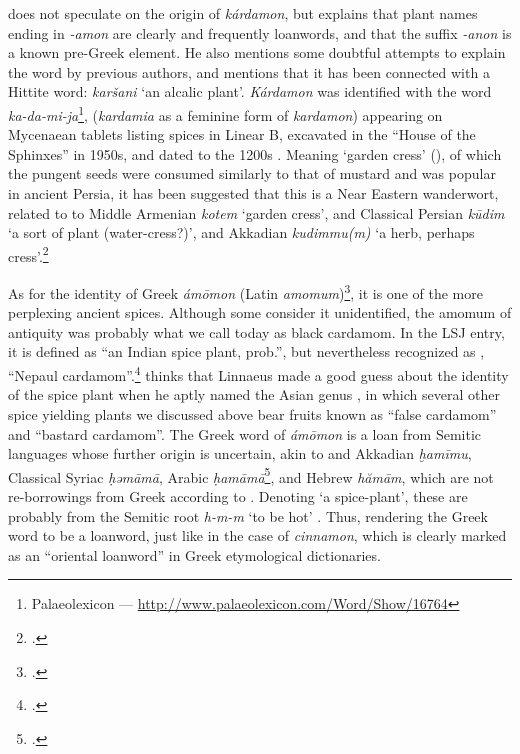 \textcite[644]{beekes_etymological_2010} does not speculate on the origin of \textit{kárdamon}, but explains that plant names ending in \textit{-amon} are clearly and frequently loanwords, and that the suffix \textit{-anon} is a known pre-Greek element. He also mentions some doubtful attempts to explain the word by previous authors, and mentions that it has been connected with a Hittite word: \textit{karšani} `an alcalic plant'. \textit{Kárdamon} was identified with the word \lb{\KADAMIJA} \textit{ka-da-mi-ja}\footnote{Palaeolexicon --- \url{http://www.palaeolexicon.com/Word/Show/16764}}, (\textit{kardamia} as a feminine form of \textit{kardamon}) appearing on Mycenaean tablets listing spices in Linear B, excavated in the ``House of the Sphinxes'' in 1950s, and dated to the 1200s \BC{} \autocite[107]{bennett_mycenae_1958}. Meaning `garden cress' (), of which the pungent seeds were consumed similarly to that of mustard and was popular in ancient Persia, it has been suggested that this is a Near Eastern \gls{wanderwort}, related to to Middle Armenian  \textit{kotem} `garden cress', and Classical Persian  \textit{kūdim} `a sort of plant (water-cress?)', and Akkadian \textit{kudimmu(m)} `a herb, perhaps cress'.\footcites[cf.][p. 371 ]{kouyoumdjian_comprehensive_1970}[]{asatrian_marginal_2012}[L14]{black_concise_2000}



As for the identity of Greek \textit{ámōmon} (Latin \textit{amomum})\footcite[amomum]{lewis_latin_1879}, it is one of the more perplexing ancient spices. Although some consider it unidentified, the amomum of antiquity was probably what we call today as black cardamom. In the \gls{LSJ} entry, it is defined as ``an Indian spice plant, prob.'', but nevertheless recognized as , ``Nepaul cardamom''.\footcite[ἄμωμον]{liddell_greek-english_1940} \textcite[103]{dalby_dangerous_2000} thinks that Linnaeus made a good guess about the identity of the spice plant when he aptly named the Asian genus , in which several other spice yielding plants we discussed above bear fruits known as ``false cardamom'' and ``bastard cardamom''. The Greek word of \textit{ámōmon} is a loan from Semitic languages whose further origin is uncertain, akin to and Akkadian \textit{ḫamīmu}, Classical Syriac  \textit{ḥəmāmā}, Arabic  \textit{ḥamāmā}\footcites[cf.][vol. 6, p. 66]{roth_assyrian_2004} [cardamom ]{ahd}[169]{low_aramaeische_1881}[100]{lev_practical_2008}, and Hebrew  
\textit{hămām}, which are not re-borrowings from Greek according to \textcite[123]{low_aramaeische_1881}. Denoting `a spice-plant', these are probably from the Semitic root \textit{h-m-m} `to be hot' \parencite[222]{klein_comprehensive_1987}. Thus, rendering the Greek word to be a loanword, just like in the case of \textit{cinnamon}, which is clearly marked as an ``oriental loanword'' in Greek etymological dictionaries.

